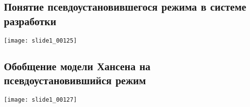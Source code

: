 \documentclass[main.tex]{subfiles}
\begin{document}

\subsection{Понятие псевдоустановившегося режима в системе разработки}

\texttt{[image: slide1\_00125]}


\subsection{Обобщение модели Хансена на псевдоустановившийся режим}

\texttt{[image: slide1\_00127]}








\end{document}
